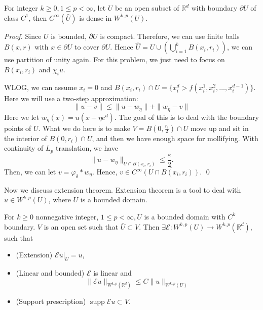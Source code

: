 \begin{theorem}
For integer $k \geq 0,1 \leq p<\infty$, let $U$ be an open subset of $\mathbb{R}^{d}$ with boundary $\partial U$ of class $C^{1}$, then $C^{\infty}(\bar{U})$ is dense in $W^{k, p}(U)$.
\end{theorem}
\begin{proof}
    Since $U$ is bounded, $\partial U$ is compact. Therefore, we can use finite balls $B(x,r)$ with $x\in \partial U$ to cover $\partial U$. 
    Hence $\hat U = U \cup \left( \bigcup_{i=1}^k B(x_i,r_i)\right)$, we can use partition of unity again. For this problem, we just need to focus on $B(x_i,r_i)$ and $\chi_i u$. 

    WLOG, we can assume $x_i = 0$ and $B(x_i,r_i)\cap U = \{x_i^d > f(x_i^1, x_i^2, \dots, x_i^{d-1})\}$.  Here we will use a two-step approximation: 
    \[
        \|u-v\|\le \|u - w_\eta\| + \|w_\eta - v\|
    \]
    Here we let $w_\eta (x) = u(x+ \eta e^d)$. The goal of this is to deal with the boundary points of $ U $. What we do here is to make $ V =B(0, \frac{r_i}{2})\cap U$ move up and sit in the interior of $ B(0, r_i)\cap U $, and then we have enough space for mollifying. With continuity of $L_p$ translation, we have 
    \[
        \|u - w_\eta \|_{U\cap B(x_i, r_i)} \le \frac{\varepsilon}{2}. 
    \]
    Then, we can let $v = \varphi_\delta * w_\eta$. Hence, $v\in C^\infty \overline{(U\cap B(x_i,r_i))}$. 
    \qed 
\end{proof}
Now we discuss extension theorem. Extension theorem is a tool to deal with $u \in W^{k, p}(U)$, where $U$ is a bounded domain.

\begin{theorem}
[Extension]
For $k \geq 0$ nonnegative integer, $1 \leq p<\infty, U$ is a bounded domain with $C^{k}$ boundary. $V$ is an open set such that $\bar{U} \subset V$. Then $\exists \mathcal{E}: W^{k, p}(U) \rightarrow W^{k, p}\left(\mathbb{R}^{d}\right)$, such that
\begin{itemize}
    \item (Extension) $\left.\mathcal{E} u\right|_{U}=u$,
    \item (Linear and bounded) $\mathcal{E}$ is linear and
    $$
\|\mathcal{E} u\|_{W^{k, p}\left(\mathbb{R}^{d}\right)} \leq C\|u\|_{W^{k, p}(U)}
$$
    \item (Support prescription) $\operatorname{supp} \mathcal{E} u \subset V$.
\end{itemize} 
\end{theorem}

